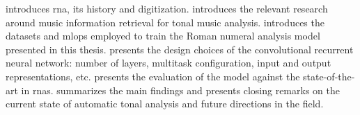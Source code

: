 
introduces \gls{rna}, its history and
digitization.  introduces the relevant
research around music information retrieval for tonal music
analysis.  introduces
the datasets and \gls{mlops} employed to train the Roman
numeral analysis model presented in this thesis.
 presents the design choices of the
convolutional recurrent neural network: number of layers,
multitask configuration, input and output representations,
etc.  presents the
evaluation of the model against the state-of-the-art in
\glspl{rna}. 
summarizes the main findings and presents closing remarks on
the current state of automatic tonal analysis and future
directions in the field.
